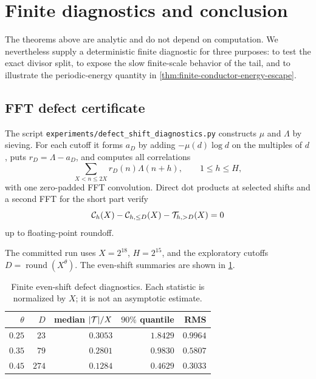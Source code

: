 \section{Finite diagnostics and conclusion}
\label{sec:computations-conclusion}

The theorems above are analytic and do not depend on computation.  We
nevertheless supply a deterministic finite diagnostic for three purposes:
to test the exact divisor split, to expose the slow finite-scale behavior of
the tail, and to illustrate the periodic-energy quantity in
\cref{thm:finite-conductor-energy-escape}.

\subsection{FFT defect certificate}
\label{subsec:FFT-certificate}

The script \texttt{experiments/defect\_shift\_diagnostics.py} constructs
$\mu$ and $\Lambda$ by sieving.  For each cutoff it forms $a_D$ by adding
$-\mu(d)\log d$ on the multiples of $d$, puts $r_D=\Lambda-a_D$, and computes
all correlations
\[
 \sum_{X<n\le2X}r_D(n)\Lambda(n+h),
 \qquad 1\le h\le H,
\]
with one zero-padded FFT convolution.  Direct dot products at selected
shifts and a second FFT for the short part verify
\begin{equation}\label{eq:finite-computational-identity}
 \mathcal C_h(X)-\mathcal C_{h,\le D}(X)-\mathcal T_{h,>D}(X)=0
\end{equation}
up to floating-point roundoff.

The committed run uses $X=2^{18}$, $H=2^{15}$, and the exploratory cutoffs
$D=\operatorname{round}(X^\theta)$.  The even-shift summaries are shown in
\cref{tab:finite-defect-quantiles}.

\begin{table}[ht]
\centering
\caption{Finite even-shift defect diagnostics.  Each statistic is normalized
by $X$; it is not an asymptotic estimate.}
\label{tab:finite-defect-quantiles}
\begin{tabular}{@{}rrrrr@{}}
\toprule
$\theta$ & $D$ & median $|\mathcal T|/X$ & $90\%$ quantile & RMS \\
\midrule
$0.25$ & $23$  & $0.3053$ & $1.8429$ & $0.9964$ \\
$0.35$ & $79$  & $0.2801$ & $0.9830$ & $0.5807$ \\
$0.45$ & $274$ & $0.1284$ & $0.4629$ & $0.3033$ \\
\bottomrule
\end{tabular}
\end{table}

